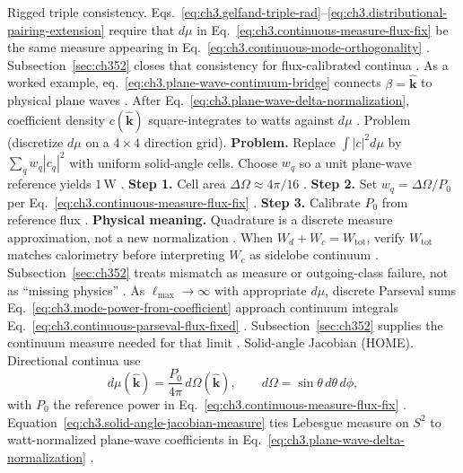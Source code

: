 Rigged triple consistency. Eqs.~\eqref{eq:ch3.gelfand-triple-rad}--\eqref{eq:ch3.distributional-pairing-extension} require that \(d\mu\) in
Eq.~\eqref{eq:ch3.continuous-measure-flux-fix} be the same measure appearing in
Eq.~\eqref{eq:ch3.continuous-mode-orthogonality} \cite{stratton1941}. Subsection~\ref{sec:ch352}
closes that consistency for flux-calibrated continua \cite{hansen1988}.
As a worked example, eq.~\eqref{eq:ch3.plane-wave-continuum-bridge} connects \(\beta=\hat{\mathbf{k}}\) to physical plane waves
\cite{jackson1999}. After Eq.~\eqref{eq:ch3.plane-wave-delta-normalization}, coefficient density \(c(\hat{\mathbf{k}})\)
square-integrates to watts against \(d\mu\) \cite{harrington2001}.
Problem (discretize \(d\mu\) on a \(4\times4\) direction grid). \textbf{Problem.} Replace \(\int|c|^{2}d\mu\) by \(\sum_{q}w_{q}|c_{q}|^{2}\) with uniform solid-angle cells. Choose \(w_{q}\)
so a unit plane-wave reference yields \(1\,\mathrm{W}\) \cite{harrington2001}.
\textbf{Step 1.} Cell area \(\Delta\Omega\approx4\pi/16\) \cite{jackson1999}.
\textbf{Step 2.} Set \(w_{q}=\Delta\Omega/P_{0}\) per Eq.~\eqref{eq:ch3.continuous-measure-flux-fix} \cite{hansen1988}.
\textbf{Step 3.} Calibrate \(P_{0}\) from reference flux \cite{poynting1884}.
\textbf{Physical meaning.} Quadrature is a discrete measure approximation, not a new normalization \cite{harrington2001}.
When \(W_{d}+W_{c}=W_{\mathrm{tot}}\), verify \(W_{\mathrm{tot}}\) matches calorimetry before interpreting \(W_{c}\) as
sidelobe continuum \cite{stratton1941}. Subsection~\ref{sec:ch352} treats mismatch as measure or outgoing-class
failure, not as ``missing physics'' \cite{hansen1988}.
As \(\ell_{\max}\to\infty\) with appropriate \(d\mu\), discrete Parseval sums Eq.~\eqref{eq:ch3.mode-power-from-coefficient}
approach continuum integrals Eq.~\eqref{eq:ch3.continuous-parseval-flux-fixed} \cite{hansen1988}.
Subsection~\ref{sec:ch352} supplies the continuum measure needed for that limit \cite{harrington2001}.
Solid-angle Jacobian (HOME). Directional continua use
\begin{equation}
\label{eq:ch3.solid-angle-jacobian-measure}
d\mu(\hat{\mathbf{k}})
=
\frac{P_{0}}{4\pi}\,d\Omega(\hat{\mathbf{k}}),
\qquad
d\Omega=\sin\theta\,d\theta\,d\phi,
\end{equation}
with \(P_{0}\) the reference power in Eq.~\eqref{eq:ch3.continuous-measure-flux-fix} \cite{jackson1999}.
Equation~\eqref{eq:ch3.solid-angle-jacobian-measure} ties Lebesgue measure on \(S^{2}\) to watt-normalized plane-wave
coefficients in Eq.~\eqref{eq:ch3.plane-wave-delta-normalization} \cite{harrington2001}.
